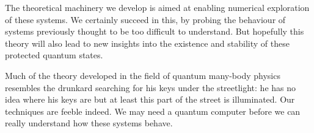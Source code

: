 \documentclass[11pt,oneside]{report}
\begin{document}
The theoretical machinery we develop is
aimed at enabling numerical exploration of these systems.
We certainly succeed in this, by probing the behaviour of
systems previously thought to be too difficult to understand.
But hopefully this theory will also lead to new insights
into the existence and stability of these protected quantum states.

Much of the theory developed in the field of quantum
many-body physics resembles the drunkard searching for his
keys under the streetlight:
he has no idea where his keys are
but at least this part of the street is illuminated.
Our techniques are feeble indeed. We may need a quantum
computer before we can really understand how these systems
behave.



{}

\end{document}
